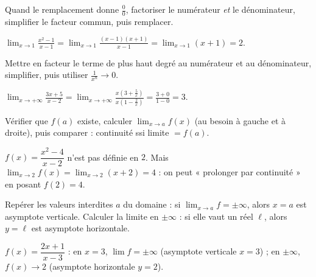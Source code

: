 Quand le remplacement donne $\frac00$, factoriser le numérateur \emph{et} le
dénominateur, simplifier le facteur commun, puis remplacer.
\begin{exemple}
$\displaystyle\lim_{x\to 1}\frac{x^2-1}{x-1}=\lim_{x\to 1}\frac{(x-1)(x+1)}{x-1}
=\lim_{x\to 1}(x+1)=2.$
\end{exemple}

Mettre en facteur le terme de plus haut degré au numérateur et au dénominateur,
simplifier, puis utiliser $\frac1{x^n}\to 0$.
\begin{exemple}
$\displaystyle\lim_{x\to +\infty}\frac{3x+5}{x-2}
=\lim_{x\to +\infty}\frac{x\!\left(3+\frac5x\right)}{x\!\left(1-\frac2x\right)}
=\frac{3+0}{1-0}=3.$
\end{exemple}

Vérifier que $f(a)$ existe, calculer $\displaystyle\lim_{x\to a}f(x)$ (au besoin à
gauche et à droite), puis comparer : continuité ssi limite $=f(a)$.
\begin{exemple}
$f(x)=\dfrac{x^2-4}{x-2}$ n'est pas définie en $2$. Mais $\displaystyle\lim_{x\to 2}f(x)
=\lim_{x\to 2}(x+2)=4$ : on peut « prolonger par continuité » en posant $f(2)=4$.
\end{exemple}

Repérer les valeurs interdites $a$ du domaine : si $\displaystyle\lim_{x\to a}f=\pm\infty$,
alors $x=a$ est asymptote verticale. Calculer la limite en $\pm\infty$ : si elle vaut
un réel $\ell$, alors $y=\ell$ est asymptote horizontale.
\begin{exemple}
$f(x)=\dfrac{2x+1}{x-3}$ : en $x=3$, $\displaystyle\lim f=\pm\infty$ (asymptote
verticale $x=3$) ; en $\pm\infty$, $f(x)\to 2$ (asymptote horizontale $y=2$).
\end{exemple}
